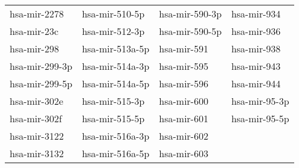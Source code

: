 \begin{table}
\begin{tabular}{|l|l|l|l|}
  hsa-mir-2278 & hsa-mir-510-5p & hsa-mir-590-3p & hsa-mir-934 \\ 
  hsa-mir-23c & hsa-mir-512-3p & hsa-mir-590-5p & hsa-mir-936 \\ 
  hsa-mir-298 & hsa-mir-513a-5p & hsa-mir-591 & hsa-mir-938 \\ 
  hsa-mir-299-3p & hsa-mir-514a-3p & hsa-mir-595 & hsa-mir-943 \\ 
  hsa-mir-299-5p & hsa-mir-514a-5p & hsa-mir-596 & hsa-mir-944 \\ 
  hsa-mir-302e & hsa-mir-515-3p & hsa-mir-600 & hsa-mir-95-3p \\ 
  hsa-mir-302f & hsa-mir-515-5p & hsa-mir-601 & hsa-mir-95-5p \\ 
  hsa-mir-3122 & hsa-mir-516a-3p & hsa-mir-602 &  \\ 
  hsa-mir-3132 & hsa-mir-516a-5p & hsa-mir-603 &  \\ 
   \hline
\end{tabular}
\vfill
\end{table}

